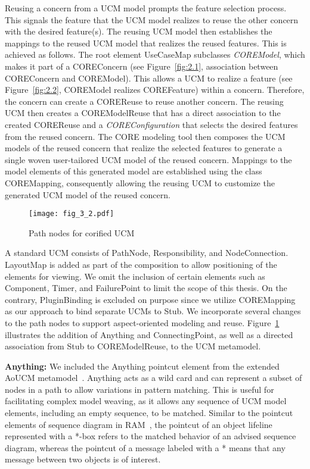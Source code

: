 Reusing a concern from a UCM model prompts the feature selection process. This signals the feature that the UCM model realizes to reuse the other concern with the desired feature(s). The reusing UCM model then establishes the mappings to the reused UCM model that realizes the reused features. This is achieved as follows. The root element {\cls UseCaseMap} subclasses \textit{\cls COREModel}, which makes it part of a {\cls COREConcern} (see Figure~\ref{fig:2.1}, association between {\cls COREConcern} and {\cls COREModel}). This allows a UCM to realize a feature (see Figure~\ref{fig:2.2}, {\cls COREModel} realizes {\cls COREFeature}) within a concern. Therefore, the concern can create a {\cls COREReuse} to reuse another concern. The reusing UCM then creates a {\cls COREModelReuse} that has a direct association to the created {\cls COREReuse} and a \textit{\cls COREConfiguration} that selects the desired features from the reused concern. The CORE modeling tool then composes the UCM models of the reused concern that realize the selected features to generate a single woven user-tailored UCM model of the reused concern. Mappings to the model elements of this generated model are established using the class {\cls COREMapping}, consequently allowing the reusing UCM to customize the generated UCM model of the reused concern.

\begin{figure}
	\centering
	\texttt{[image: fig\_3\_2.pdf]}
	\caption{Path nodes for corified UCM}
	\label{fig:3.2}
\end{figure}

A standard UCM consists of {\cls PathNode}, {\cls Responsibility}, and {\cls NodeConnection}. {\cls LayoutMap} is added as part of the composition to allow positioning of the elements for viewing. We omit the inclusion of certain elements such as {\cls Component}, {\cls Timer}, and {\cls FailurePoint} to limit the scope of this thesis. On the contrary, {\cls PluginBinding} is excluded on purpose since we utilize {\cls COREMapping} as our approach to bind separate UCMs to {\cls Stub}. We incorporate several changes to the path nodes to support aspect-oriented modeling and reuse. Figure~\ref{fig:3.2} illustrates the addition of {\cls Anything} and {\cls ConnectingPoint}, as well as a directed association from {\cls Stub} to {\cls COREModelReuse}, to the UCM metamodel.

\textbf{\cls Anything:} We included the {\cls Anything} pointcut element from the extended AoUCM metamodel~\cite{mussbacher2011aspect}. {\cls Anything} acts as a wild card and can represent a subset of nodes in a path to allow variations in pattern matching. This is useful for facilitating complex model weaving, as it allows any sequence of UCM model elements, including an empty sequence, to be matched. Similar to the pointcut elements of sequence diagram in RAM~\cite{kienzle2009aspect}, the pointcut of an object lifeline represented with a *-box refers to the matched behavior of an advised sequence diagram, whereas the pointcut of a message labeled with a * means that any message between two objects is of interest.

